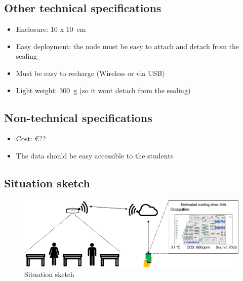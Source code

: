 \documentclass[11pt,a4paper]{article}
\begin{document}
	\subsection{Other technical specifications}
	\begin{itemize}
		\item Enclosure: 10 x \SI{10}{\centi\meter}
		\item Easy deployment: the node must be easy to attach and detach from the sealing
		\item Must be easy to recharge (Wireless or via USB)
		\item Light weight: \SI{300}{\gram} (so it wont detach from the sealing)
	\end{itemize}
	
	\subsection{Non-technical specifications}
	\begin{itemize}
		\item Cost: \euro{??}
		\item The data should be easy accessible to the students
		
	\end{itemize}
	\subsection{Situation sketch}
	\begin{figure}[!ht]
		\centering
		\includegraphics[width=1\linewidth]{situation.pdf}
		\caption{Situation sketch}
		\label{fig:situation}
	\end{figure} 
	\newpage
\end{document}
